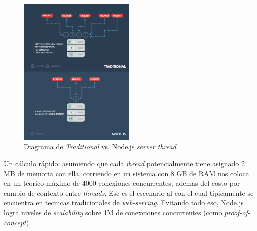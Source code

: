 \begin{figure}[h!]
	\centering
	\includegraphics[width=0.5\textwidth]{figuras/cap2/diagram_traditional_vs_node_serverthread.png}
	\caption{Diagrama de \textit{Traditional} vs. Node.js \textit{server thread}}
\end{figure}



Un cálculo rápido: asumiendo que cada \textit{thread} potencialmente tiene asignado 2 MB de memoria con ella, corriendo en un sistema con 8 GB de RAM nos coloca en un teorico máximo de 4000 conexiones concurrentes, ademas del costo por cambio de contexto entre \textit{threads}. Ese es el escenario al con el cual tipicamente se encuentra en tecnicas tradicionales de \textit{web-serving}. Evitando todo eso, Node.js logra niveles de \textit{scalability} sobre 1M de conexciones concurrentes (como \textit{proof-of-concept}).

